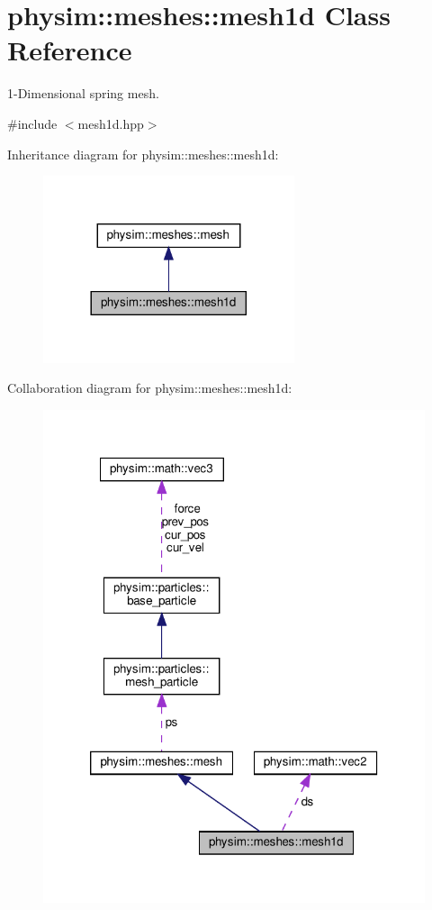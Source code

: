 \hypertarget{classphysim_1_1meshes_1_1mesh1d}{}\section{physim\+:\+:meshes\+:\+:mesh1d Class Reference}
\label{classphysim_1_1meshes_1_1mesh1d}


1-\/\+Dimensional spring mesh.  




{\ttfamily \#include $<$mesh1d.\+hpp$>$}



Inheritance diagram for physim\+:\+:meshes\+:\+:mesh1d\+:\nopagebreak
\begin{figure}[H]
\begin{center}
\leavevmode
\includegraphics[width=209pt]{classphysim_1_1meshes_1_1mesh1d__inherit__graph}
\end{center}
\end{figure}


Collaboration diagram for physim\+:\+:meshes\+:\+:mesh1d\+:\nopagebreak
\begin{figure}[H]
\begin{center}
\leavevmode
\includegraphics[width=320pt]{classphysim_1_1meshes_1_1mesh1d__coll__graph}
\end{center}
\end{figure}
